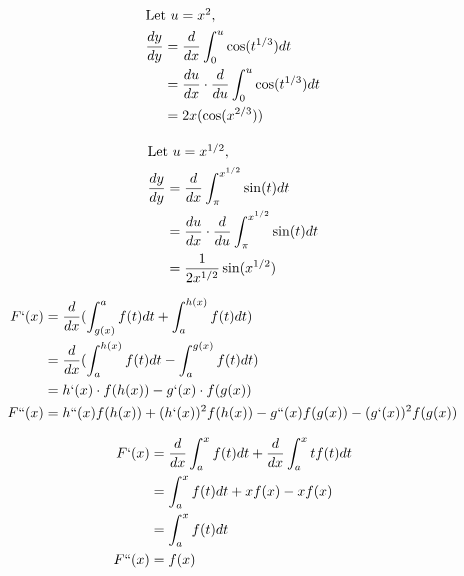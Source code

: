 \documentclass[12pt]{article}
\newenvironment{problem}[2][Problem]{\begin{trivlist}
\item[\hskip \labelsep {\bfseries #1}\hskip \labelsep {\bfseries #2.}]}{\end{trivlist}}
\begin{document}
\begin{problem}{4.a}
\end{problem}
\begin{align*}
\intertext{Let $u = x^2$,}
\frac{dy}{dy} &= \frac{d}{dx} \int_{0}^{u} \cos(t^{1/3})dt \\
&= \frac{du}{dx} \cdot \frac{d}{du} \int_{0}^{u} \cos(t^{1/3})dt\\
&= 2x (\cos(x^{2/3}))
\end{align*}

\begin{problem}{4.b}
\end{problem}
\begin{align*}
\intertext{Let $u = x^{1/2}$,}
\frac{dy}{dy} &= \frac{d}{dx} \int_{\pi}^{x^{1/2}} \sin(t)dt \\
&= \frac{du}{dx} \cdot \frac{d}{du} \int_{\pi}^{x^{1/2}} \sin(t)dt\\
&= \frac{1}{2x^{1/2}} \sin(x^{1/2})
\end{align*}

\begin{problem}{5}
\end{problem}
\begin{align*}
F`(x) &=\frac{d}{dx}(\int_{g(x)}^{a} f(t)dt + \int_{a}^{h(x)} f(t)dt) \\
&= \frac{d}{dx}( \int_{a}^{h(x)} f(t)dt -\int_{a}^{g(x)} f(t)dt ) \\
&= h`(x) \cdot f(h(x)) - g`(x) \cdot f(g(x))\\
F``(x) &= h``(x)f(h(x)) + (h`(x))^2f(h(x)) - g``(x)f(g(x)) - (g`(x))^2f(g(x))
\end{align*}

\begin{problem}{6}
\end{problem}
\begin{align*}
F`(x) &= \frac{d}{dx} \int_{a}^{x} f(t)dt + \frac{d}{dx} \int_{a}^{x} tf(t)dt \\ 
&= \int_{a}^{x} f(t)dt + xf(x) - xf(x) \\
&= \int_{a}^{x} f(t)dt\\
F``(x) &= f(x)
\end{align*}
\end{document}
